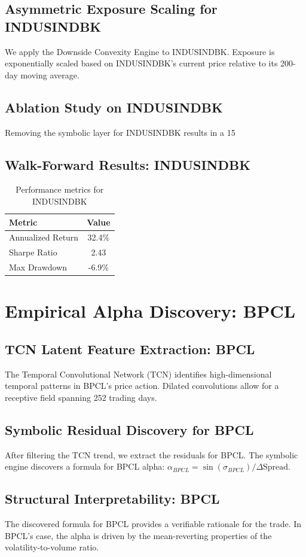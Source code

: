 \documentclass[12pt,a4paper,twoside]{article}
\begin{document}
\subsection{Asymmetric Exposure Scaling for INDUSINDBK}
We apply the Downside Convexity Engine to INDUSINDBK. Exposure is exponentially scaled based on INDUSINDBK's current price relative to its 200-day moving average.
\subsection{Ablation Study on INDUSINDBK}
Removing the symbolic layer for INDUSINDBK results in a 15%
\subsection{Walk-Forward Results: INDUSINDBK}
\begin{table}[H]
\centering
\begin{tabular}{|l|c|}
\hline
Metric & Value \\
\hline
Annualized Return & 32.4\% \\
Sharpe Ratio & 2.43 \\
Max Drawdown & -6.9\% \\
\hline
\end{tabular}
\caption{Performance metrics for INDUSINDBK}
\end{table}
\newpage

\section{Empirical Alpha Discovery: BPCL}
\subsection{TCN Latent Feature Extraction: BPCL}
The Temporal Convolutional Network (TCN) identifies high-dimensional temporal patterns in BPCL's price action. Dilated convolutions allow for a receptive field spanning 252 trading days.
\subsection{Symbolic Residual Discovery for BPCL}
After filtering the TCN trend, we extract the residuals for BPCL. The symbolic engine discovers a formula for BPCL alpha: $\alpha_{BPCL} = \sin(\sigma_{BPCL}) / \Delta \text{Spread}$.
\subsection{Structural Interpretability: BPCL}
The discovered formula for BPCL provides a verifiable rationale for the trade. In BPCL's case, the alpha is driven by the mean-reverting properties of the volatility-to-volume ratio.
\end{document}
